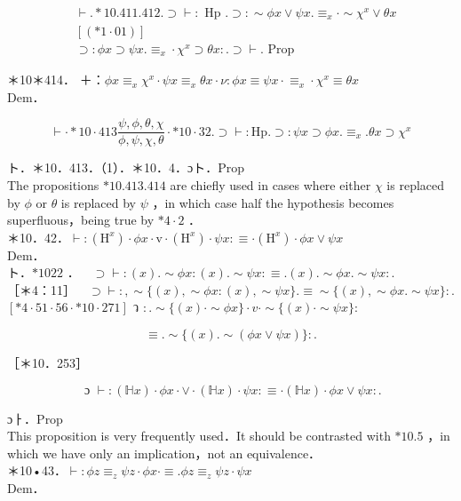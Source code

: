 \documentclass[10pt]{article}
\begin{document}
$$
\begin{aligned}
& \vdash . * 10.411 .412 . \supset \vdash: \text { Hp } . \supset: \sim \phi x \vee \psi x . \equiv_{x} \cdot \sim \chi^{x} \vee \theta x \\
& {[(* 1 \cdot 01)]} \\
& \supset: \phi x \supset \psi x . \equiv_{x} \cdot \chi^{x} \supset \theta x: . \supset \vdash . \text { Prop }
\end{aligned}
$$

＊10＊414． ＋：$\phi x \equiv_{x} \chi^{x} \cdot \psi x \equiv_{x} \theta x \cdot \nu: \phi x \equiv \psi x \cdot \equiv_{x} \cdot \chi^{x} \equiv \theta x$\\
Dem．


\begin{equation*}
\vdash \cdot * 10 \cdot 413 \frac{\psi, \phi, \theta, \chi}{\phi, \psi, \chi, \theta} \cdot * 10 \cdot 32 . \supset \vdash: \mathrm{Hp} . \supset: \psi x \supset \phi x . \equiv_{x} . \theta x \supset \chi^{x} \tag{1}
\end{equation*}


ト．＊10．413．（1）．＊10．4．ɔト．Prop\\
The propositions $* 10.413 .414$ are chiefly used in cases where either $\chi$ is replaced by $\phi$ or $\theta$ is replaced by $\psi$ ，in which case half the hypothesis becomes superfluous，being true by $* 4 \cdot 2$ ．\\
＊10．42．$\vdash:\left(\mathrm{H}^{x}\right) \cdot \phi x \cdot \mathrm{v} \cdot\left(\mathrm{H}^{x}\right) \cdot \psi x: \equiv \cdot\left(\mathrm{H}^{x}\right) \cdot \phi x \vee \psi x$\\
Dem．\\
ト．$* 1022$ ．$\quad \supset \vdash:(x) . \sim \phi x:(x) . \sim \psi x: \equiv .(x) . \sim \phi x . \sim \psi x:$.\\
［＊4：11］$\quad \supset \vdash:, \sim\{(x), \sim \phi x:(x), \sim \psi x\} . \equiv \sim\{(x), \sim \phi x . \sim \psi x\}:$. $[* 4 \cdot 51 \cdot 56 \cdot * 10 \cdot 271]$ ว $: . \sim\{(x) \cdot \sim \phi x\} \cdot v \cdot \sim\{(x) \cdot \sim \psi x\}:$

$$
\equiv . \sim\{(x) . \sim(\phi x \vee \psi x)\}: .
$$

［＊10．253］

$$
\text { ɔ } \vdash:(\mathbb{H} x) \cdot \phi x \cdot \vee \cdot(\mathbb{H} x) \cdot \psi x: \equiv \cdot(\mathbb{H} x) \cdot \phi x \vee \psi x: .
$$

ɔㅏ．Prop\\
This proposition is very frequently used．It should be contrasted with $* 10.5$ ，in which we have only an implication，not an equivalence．\\
＊10•43．$\vdash: \phi z \equiv_{z} \psi z \cdot \phi x \cdot \equiv . \phi z \equiv_{z} \psi z \cdot \psi x$\\
Dem．
\end{document}
